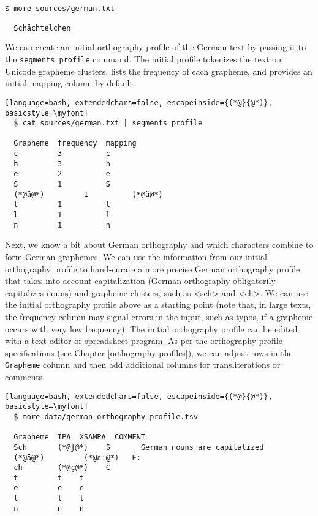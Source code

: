 \documentclass[output=book,nonflat,modfonts,
citecolor=brown,
		]{langsci/langscibook}\usepackage[]{graphicx}\usepackage[]{color}
\begin{document}
\begin{lstlisting}[language=bash, basicstyle=\myfont]
  $ more sources/german.txt

  Schächtelchen
\end{lstlisting}

\noindent We can create an initial orthography profile of the German text by passing it to the \texttt{segments profile} command. The initial profile tokenizes the text on Unicode grapheme clusters, lists the frequency of each grapheme, and provides an initial mapping column by default.

\begin{lstlisting}[language=bash, extendedchars=false, escapeinside={(*@}{@*)}, basicstyle=\myfont]
  $ cat sources/german.txt | segments profile

  Grapheme  frequency  mapping
  c         3          c
  h         3          h
  e         2          e
  S         1          S
  (*@ä@*)         1          (*@ä@*)
  t         1          t
  l         1          l
  n         1          n
\end{lstlisting}

\noindent Next, we know a bit about German orthography and which characters combine to form German graphemes. We can use the information from our initial orthography profile to hand-curate a more precise German orthography profile that takes into account capitalization (German orthography obligatorily capitalizes nouns) and grapheme clusters, such as <sch> and <ch>. We can use the initial orthography profile above as a starting point (note that, in large texts, the frequency column may signal errors in the input, such as typos, if a grapheme occurs with very low frequency). The initial orthography profile can be edited with a text editor or spreadsheet program. As per the orthography profile specifications (see Chapter \ref{orthography-profiles}), we can adjust rows in the \texttt{Grapheme} column and then add additional columns for transliterations or comments.


\begin{lstlisting}[language=bash, extendedchars=false, escapeinside={(*@}{@*)}, basicstyle=\myfont]
  $ more data/german-orthography-profile.tsv

  Grapheme  IPA  XSAMPA  COMMENT                     
  Sch       (*@ʃ@*)    S       German nouns are capitalized
  (*@ä@*)         (*@ɛː@*)   E:                                  
  ch        (*@ç@*)    C                                   
  t         t    t                                   
  e         e    e                                   
  l         l    l                                   
  n         n    n                                    
\end{lstlisting}
\end{document}
